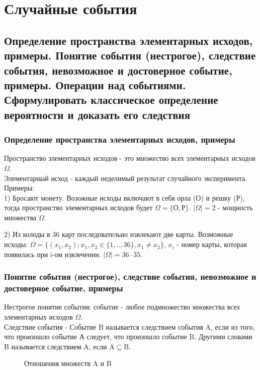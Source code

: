 \chapter{Случайные события}

\section{Определение пространства элементарных исходов, примеры. Понятие события (нестрогое), следствие события, невозможное и достоверное событие, примеры. Операции над событиями. Сформулировать классическое определение вероятности и доказать его следствия}

\subsection{Определение пространства элементарных исходов, примеры}
Пространство элементарных исходов - это множество всех элементарных исходов $\Omega$.\\

Элементарный исход - каждый неделимый результат случайного эксперимента.\\

Примеры:\\
1) Бросают монету. Возожные исходы включают в себя орла (О) и решку (Р), тогда пространство элементарных исходов будет $\Omega = \{$О$, $Р$\}$. $|\Omega| = 2$ - мощность множества $\Omega$.

2) Из колоды в 36 карт последовательно извлекают две карты.
Возможные исходы: $\Omega = \{(x_1, x_2): x_1, x_2 \in \{1, .. , 36\}, x_1 \neq x_2$\}, $x_i$ - номер карты, которая появилась при i-ом извлечении. $|\Omega| = 36 \cdot 35$.

\subsection{Понятие события (нестрогое), следствие события, невозможное и достоверное событие, примеры}

Нестрогое понятие события: событие - любое подмножество множества всех элементарных исходов $\Omega$.\\

Следствие события - Событие B называется следствием события A, если из того, что произошло событие А следует, что произошло событие B. Другими словами B называется следствием A, если A$\subseteq$B.\\

\begin{figure}[H]
	\caption{Отношения множеств A и B}
\end{figure}

